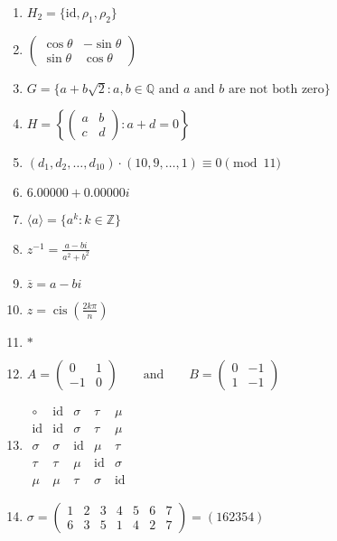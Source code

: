 \documentclass[oneside,10pt,]{article}
\newcommand{\identity}{\mathrm{id}}
\newcommand{\cis}{\operatorname{cis}}
\begin{document}
\begin{enumerate}
\item{}\(H_2 = \{ \identity, \rho_1, \rho_2 \}\)%
\item{}\(\begin{pmatrix} \cos \theta & -\sin \theta \\ \sin \theta & \cos \theta \end{pmatrix}\)%
\item{}\(G = \{ a + b \sqrt{2} : a, b \in {\mathbb Q} \text{ and } a \text{ and } b \text{ are not both zero} \}\)%
\item{}\(H = \left\{ \begin{pmatrix} a & b \\ c & d \end{pmatrix} : a + d = 0 \right\}\)%
\item{}\((d_1, d_2, \ldots, d_{10} ) \cdot (10, 9, \ldots, 1 ) \equiv 0 \pmod{11}\)%
\item{}\(6.00000+0.00000i\)%
\item{}\(\langle a \rangle = \{ a^k : k \in {\mathbb Z} \}\)%
\item{}\(z^{-1} = \frac{a-bi}{ a^2 + b^2 }\)%
\item{}\(\overline{z} = a- bi\)%
\item{}\(z = \cis\left( \frac{2 k \pi}{n } \right)\)%
\item{}\(\ast\)%
\item{}\(A = \begin{pmatrix} 0 & 1 \\ -1 & 0 \end{pmatrix} \qquad \text{and} \qquad B = \begin{pmatrix} 0 & -1 \\ 1 & -1 \end{pmatrix}\)%
\item{}\(\begin{array}{c|cccc} \circ & \identity & \sigma & \tau & \mu \\ \hline \identity & \identity & \sigma & \tau & \mu \\ \sigma & \sigma & \identity & \mu & \tau \\ \tau & \tau & \mu & \identity & \sigma \\ \mu & \mu & \tau & \sigma & \identity \end{array}\)%
\item{}\(\sigma = \begin{pmatrix} 1 & 2 & 3 & 4 & 5 & 6 & 7\\ 6 & 3 & 5 & 1 & 4 & 2 & 7 \end{pmatrix} = (1 6 2 3 5 4 )\)%

\end{enumerate}
\end{document}
